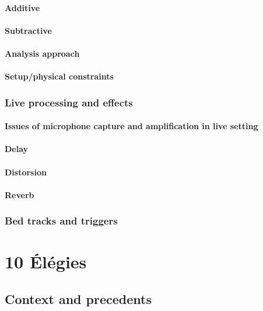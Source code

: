 \documentclass[12pt,twoside,maitrise]{dms}
\theoremstyle{definition}
\numberwithin{equation}{section}
\numberwithin{table}{chapter}
\numberwithin{figure}{chapter}
\begin{document}
\subsubsection{Additive}

\subsubsection{Subtractive}

\subsubsection{Analysis approach}

\subsubsection{Setup/physical constraints}

\subsection{Live processing and effects}

\subsubsection{Issues of microphone capture and amplification in live setting}

\subsubsection{Delay}

\subsubsection{Distorsion}

\subsubsection{Reverb}

\subsection{Bed tracks and triggers}

\chapter{10 Élégies}

\section{Context and precedents}
\end{document}
